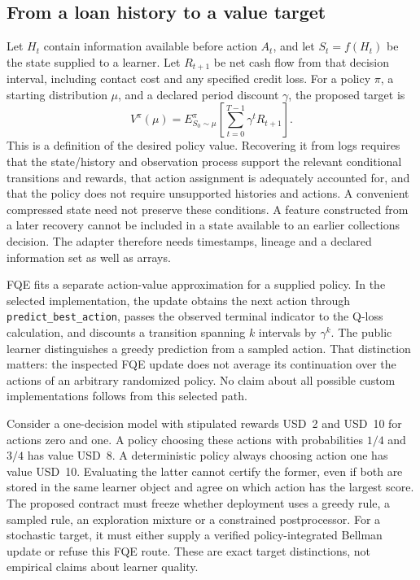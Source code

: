 \subsection{From a loan history to a value target}

Let \(H_t\) contain information available before action \(A_t\), and let
\(S_t=f(H_t)\) be the state supplied to a learner. Let \(R_{t+1}\) be net
cash flow from that decision interval, including contact cost and any
specified credit loss. For a policy \(\pi\), a starting distribution \(\mu\),
and a declared period discount \(\gamma\), the proposed target is
\[
 V^{\pi}(\mu)=E_{S_0\sim\mu}^{\pi}
       \left[\sum_{t=0}^{T-1}\gamma^t R_{t+1}\right].
\]
This is a definition of the desired policy value. Recovering it from logs
requires that the state/history and observation process support the relevant
conditional transitions and rewards, that action assignment is adequately
accounted for, and that the policy does not require unsupported histories and
actions. A convenient compressed state need not preserve these conditions.
A feature constructed from a later recovery cannot be included in a state
available to an earlier collections decision. The adapter therefore needs
timestamps, lineage and a declared information set as well as arrays.
\citep{exec15_d3rlpy_contract}

FQE fits a separate action-value approximation for a supplied policy. In
the selected implementation, the update obtains the next action through
\texttt{predict\_best\_action}, passes the observed terminal indicator to the
Q-loss calculation, and discounts a transition spanning \(k\) intervals by
\(\gamma^k\). The public learner distinguishes a greedy prediction from a
sampled action. That distinction matters: the inspected FQE update does not
average its continuation over the actions of an arbitrary randomized policy.
No claim about all possible custom implementations follows from this selected
path. \citep{exec15_d3rlpy_value}

Consider a one-decision model with stipulated rewards USD~2 and USD~10 for
actions zero and one. A policy choosing these actions with probabilities
\(1/4\) and \(3/4\) has value USD~8. A deterministic policy always choosing
action one has value USD~10. Evaluating the latter cannot certify the former,
even if both are stored in the same learner object and agree on which action
has the largest score. The proposed contract must freeze whether deployment
uses a greedy rule, a sampled rule, an exploration mixture or a constrained
postprocessor. For a stochastic target, it must either supply a verified
policy-integrated Bellman update or refuse this FQE route. These are exact
target distinctions, not empirical claims about learner quality.
\citep{exec15_d3rlpy_exact,exec15_d3rlpy_contract}

